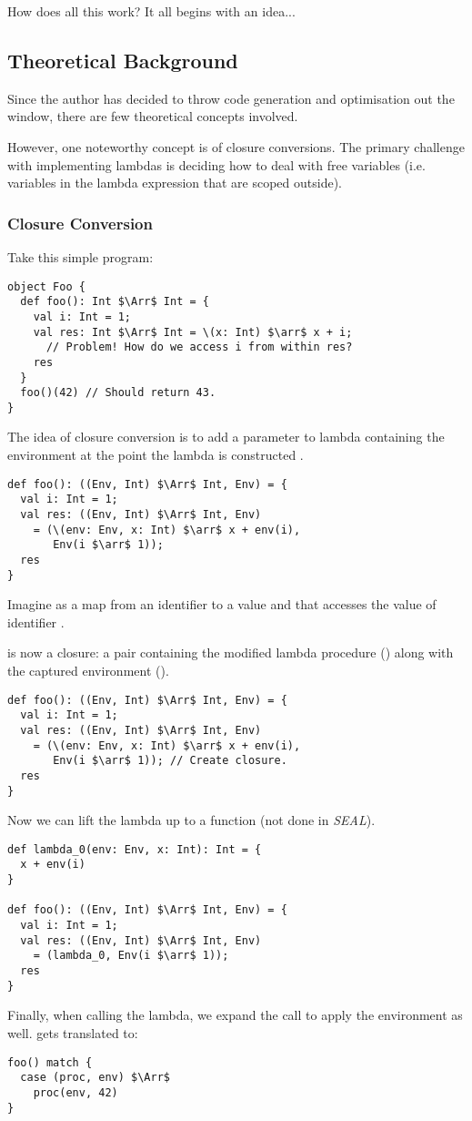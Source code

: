How does all this work? It all begins with an idea...

\subsection{Theoretical Background}
Since the author has decided to throw code generation and optimisation out the window, there are few theoretical concepts involved.

However, one noteworthy concept is of closure conversions. The primary challenge with implementing lambdas is deciding how to deal with free variables (i.e. variables in the lambda expression that are scoped outside).


\subsubsection{Closure Conversion}\label{sec:closure-convert}
Take this simple program:
\begin{lstlisting}
object Foo {
  def foo(): Int $\Arr$ Int = {
    val i: Int = 1;
    val res: Int $\Arr$ Int = \(x: Int) $\arr$ x + i;
      // Problem! How do we access i from within res?
    res
  }
  foo()(42) // Should return 43.
}
\end{lstlisting}
The idea of closure conversion is to add a parameter to lambda containing the environment at the point the lambda is constructed \cite{ClosureConversion}.
\begin{lstlisting}
def foo(): ((Env, Int) $\Arr$ Int, Env) = {
  val i: Int = 1;
  val res: ((Env, Int) $\Arr$ Int, Env)
    = (\(env: Env, x: Int) $\arr$ x + env(i),
       Env(i $\arr$ 1));
  res
}
\end{lstlisting}
Imagine  as a map from an identifier to a value and that  accesses the value of identifier .

 is now a closure: a pair containing the modified lambda procedure () along with the captured environment ().
\begin{lstlisting}
def foo(): ((Env, Int) $\Arr$ Int, Env) = {
  val i: Int = 1;
  val res: ((Env, Int) $\Arr$ Int, Env)
    = (\(env: Env, x: Int) $\arr$ x + env(i),
       Env(i $\arr$ 1)); // Create closure.
  res
}
\end{lstlisting}
Now we can lift the lambda up to a function (not done in \textit{SEAL}).
\begin{lstlisting}
def lambda_0(env: Env, x: Int): Int = {
  x + env(i)
}

def foo(): ((Env, Int) $\Arr$ Int, Env) = {
  val i: Int = 1;
  val res: ((Env, Int) $\Arr$ Int, Env)
    = (lambda_0, Env(i $\arr$ 1));
  res
}
\end{lstlisting}
Finally, when calling the lambda, we expand the call to apply the environment as well.  gets translated to:
\begin{lstlisting}
foo() match {
  case (proc, env) $\Arr$
    proc(env, 42)
}
\end{lstlisting} 


